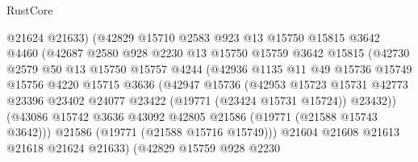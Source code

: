 \begin{lexlean}{RustCore}
\begin{coremodule}
                          @21624
                          @21633)
                        (@42829
                          @15710
                          @2583
                          @923
                          @13
                          @15750
                          @15815
                          @3642
                          @4460
                          (@42687
                            @2580
                            @928
                            @2230
                            @13
                            @15750
                            @15759
                            @3642
                            @15815
                            (@42730
                              @2579
                              @50
                              @13
                              @15750
                              @15757
                              @4244
                              (@42936
                                @1135
                                @11
                                @49
                                @15736
                                @15749
                                @15756
                                @4220
                                @15715
                                @3636
                                (@42947
                                  @15736
                                  (@42953
                                    @15723
                                    @15731
                                    @42773
                                    @23396
                                    @23402
                                    @24077
                                    @23422
                                    (@19771 (@23424 @15731 @15724))
                                    @23432))
                                (@43086
                                  @15742
                                  @3636
                                  @43092
                                  @42805
                                  @21586
                                  (@19771 (@21588 @15743 @3642)))
                                @21586
                                (@19771 (@21588 @15716 @15749)))
                              @21604
                              @21608
                              @21613
                              @21618
                              @21624
                              @21633)
                            (@42829
                              @15759
                              @928
                              @2230

\end{coremodule}
\end{lexlean}
